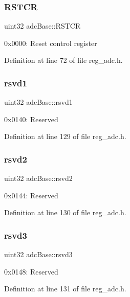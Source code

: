 \subsubsection{\texorpdfstring{R\+S\+T\+CR}{RSTCR}}
{\footnotesize\ttfamily uint32 adc\+Base\+::\+R\+S\+T\+CR}

0x0000\+: Reset control register 

Definition at line 72 of file reg\+\_\+adc.\+h.

\mbox{\label{structadcBase_a8f69539e251a55549f040160b12484a8}} 
\subsubsection{\texorpdfstring{rsvd1}{rsvd1}}
{\footnotesize\ttfamily uint32 adc\+Base\+::rsvd1}

0x0140\+: Reserved 

Definition at line 129 of file reg\+\_\+adc.\+h.

\mbox{\label{structadcBase_a4b8ab6764f7589cd79605f5f52baa09b}} 
\subsubsection{\texorpdfstring{rsvd2}{rsvd2}}
{\footnotesize\ttfamily uint32 adc\+Base\+::rsvd2}

0x0144\+: Reserved 

Definition at line 130 of file reg\+\_\+adc.\+h.

\mbox{\label{structadcBase_a7a97f3493456646e082804fe861ca249}} 
\subsubsection{\texorpdfstring{rsvd3}{rsvd3}}
{\footnotesize\ttfamily uint32 adc\+Base\+::rsvd3}

0x0148\+: Reserved 

Definition at line 131 of file reg\+\_\+adc.\+h.

\mbox{\label{structadcBase_aebf85ec0db73048b4437abdd2818228b}} 
